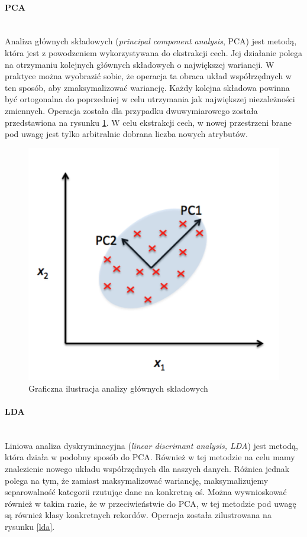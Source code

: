 \paragraph{PCA}\mbox{}\\
Analiza głównych składowych (\textit{principal component analysis}, PCA) jest metodą, która jest z powodzeniem wykorzystywana do ekstrakcji cech. Jej działanie polega na otrzymaniu kolejnych głównych składowych o największej wariancji. W praktyce można wyobrazić sobie, że operacja ta obraca układ współrzędnych w ten sposób, aby zmaksymalizować wariancję. Każdy kolejna składowa powinna być ortogonalna do poprzedniej w celu utrzymania jak największej niezależności zmiennych. Operacja została dla przypadku dwuwymiarowego została przedstawiona na rysunku \ref{pca}. W celu ekstrakcji cech, w nowej przestrzeni brane pod uwagę jest tylko arbitralnie dobrana liczba nowych atrybutów.
\begin{figure}[ht!]
\centering
\includegraphics[scale=0.5]{res/pca.png}
\caption[Caption for LOF]{Graficzna ilustracja analizy głównych składowych\footnotemark} \label{pca} 
\end{figure}

\paragraph{LDA}\mbox{}\\
Liniowa analiza dyskryminacyjna (\textit{linear discrimant analysis, LDA}) jest metodą, która działa w podobny sposób do PCA. Również w tej metodzie na celu mamy znalezienie nowego układu współrzędnych dla naszych danych. Różnica jednak polega na tym, że zamiast maksymalizować wariancję, maksymalizujemy separowalność kategorii rzutując dane na konkretną oś. Można wywnioskować również w takim razie, że w przeciwieństwie do PCA, w tej metodzie pod uwagę są również klasy konkretnych rekordów. Operacja została zilustrowana na rysunku \ref{lda}. 

